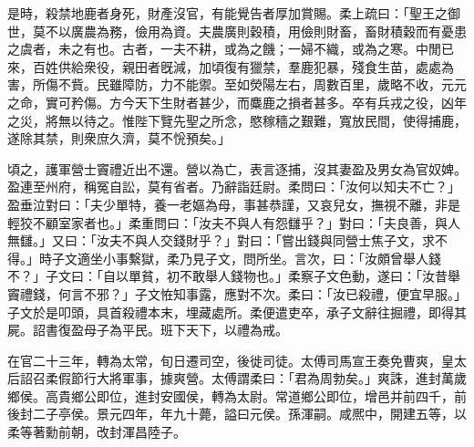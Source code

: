 \begin{pinyinscope}
 
是時，殺禁地鹿者身死，財產沒官，有能覺告者厚加賞賜。柔上疏曰：「聖王之御世，莫不以廣農為務，儉用為資。夫農廣則穀積，用儉則財畜，畜財積穀而有憂患之虞者，未之有也。古者，一夫不耕，或為之饑；一婦不織，或為之寒。中閒已來，百姓供給衆役，親田者旣減，加頃復有獵禁，羣鹿犯暴，殘食生苗，處處為害，所傷不貲。民雖障防，力不能禦。至如熒陽左右，周數百里，歲略不收，元元之命，實可矜傷。方今天下生財者甚少，而麋鹿之損者甚多。卒有兵戎之役，凶年之災，將無以待之。惟陛下覽先聖之所念，愍稼穡之艱難，寬放民間，使得捕鹿，遂除其禁，則衆庶久濟，莫不恱預矣。」
 
 
 
 
 頃之，護軍營士竇禮近出不還。營以為亡，表言逐捕，沒其妻盈及男女為官奴婢。盈連至州府，稱冤自訟，莫有省者。乃辭詣廷尉。柔問曰：「汝何以知夫不亡？」盈垂泣對曰：「夫少單特，養一老嫗為母，事甚恭謹，又哀兒女，撫視不離，非是輕狡不顧室家者也。」柔重問曰：「汝夫不與人有怨讎乎？」對曰：「夫良善，與人無讎。」又曰：「汝夫不與人交錢財乎？」對曰：「嘗出錢與同營士焦子文，求不得。」時子文適坐小事繫獄，柔乃見子文，問所坐。言次，曰：「汝頗曾舉人錢不？」子文曰：「自以單貧，初不敢舉人錢物也。」柔察子文色動，遂曰：「汝昔舉竇禮錢，何言不邪？」子文恠知事露，應對不次。柔曰：「汝已殺禮，便宜早服。」子文於是叩頭，具首殺禮本末，埋藏處所。柔便遣吏卒，承子文辭往掘禮，即得其屍。詔書復盈母子為平民。班下天下，以禮為戒。
 
 
在官二十三年，轉為太常，旬日遷司空，後徙司徒。太傅司馬宣王奏免曹爽，皇太后詔召柔假節行大將軍事，據爽營。太傅謂柔曰：「君為周勃矣。」爽誅，進封萬歲鄉侯。高貴鄉公即位，進封安國侯，轉為太尉。常道鄉公即位，增邑并前四千，前後封二子亭侯。景元四年，年九十薨，謚曰元侯。孫渾嗣。咸熈中，開建五等，以柔等著勳前朝，改封渾昌陸子。
 
 
\end{pinyinscope}
